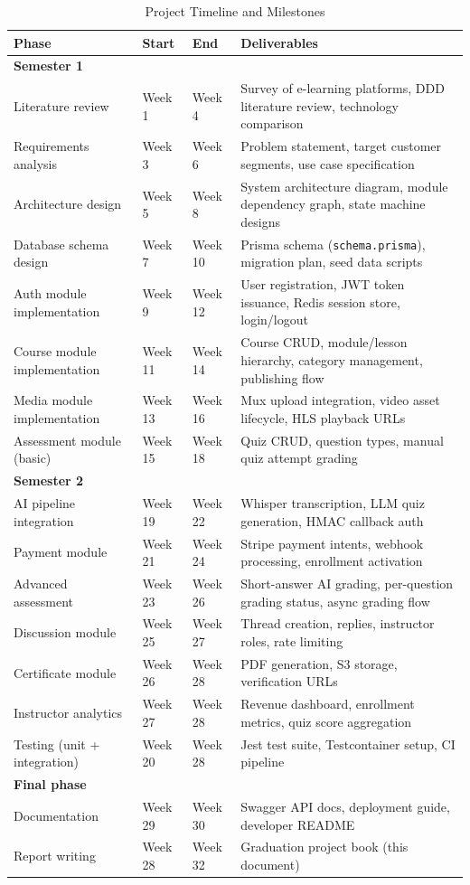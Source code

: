 \begin{table}[H]
  \centering
  \caption{Project Timeline and Milestones}\label{tab:app-schedule}
  \small
  \begin{tabular}{lp{2.2cm}p{2.2cm}p{5.5cm}}
    \toprule
    \textbf{Phase} & \textbf{Start} & \textbf{End} & \textbf{Deliverables} \\
    \midrule
    \textbf{Semester 1} & & & \\
    Literature review & Week 1 & Week 4 & Survey of e-learning platforms, DDD literature review, technology comparison \\
    Requirements analysis & Week 3 & Week 6 & Problem statement, target customer segments, use case specification \\
    Architecture design & Week 5 & Week 8 & System architecture diagram, module dependency graph, state machine designs \\
    Database schema design & Week 7 & Week 10 & Prisma schema (\texttt{schema.prisma}), migration plan, seed data scripts \\
    Auth module implementation & Week 9 & Week 12 & User registration, JWT token issuance, Redis session store, login/logout \\
    Course module implementation & Week 11 & Week 14 & Course CRUD, module/lesson hierarchy, category management, publishing flow \\
    Media module implementation & Week 13 & Week 16 & Mux upload integration, video asset lifecycle, HLS playback URLs \\
    Assessment module (basic) & Week 15 & Week 18 & Quiz CRUD, question types, manual quiz attempt grading \\
    \midrule
    \textbf{Semester 2} & & & \\
    AI pipeline integration & Week 19 & Week 22 & Whisper transcription, LLM quiz generation, HMAC callback auth \\
    Payment module & Week 21 & Week 24 & Stripe payment intents, webhook processing, enrollment activation \\
    Advanced assessment & Week 23 & Week 26 & Short-answer AI grading, per-question grading status, async grading flow \\
    Discussion module & Week 25 & Week 27 & Thread creation, replies, instructor roles, rate limiting \\
    Certificate module & Week 26 & Week 28 & PDF generation, S3 storage, verification URLs \\
    Instructor analytics & Week 27 & Week 28 & Revenue dashboard, enrollment metrics, quiz score aggregation \\
    Testing (unit + integration) & Week 20 & Week 28 & Jest test suite, Testcontainer setup, CI pipeline \\
    \midrule
    \textbf{Final phase} & & & \\
    Documentation & Week 29 & Week 30 & Swagger API docs, deployment guide, developer README \\
    Report writing & Week 28 & Week 32 & Graduation project book (this document) \\
    \bottomrule
  \end{tabular}
\end{table}

